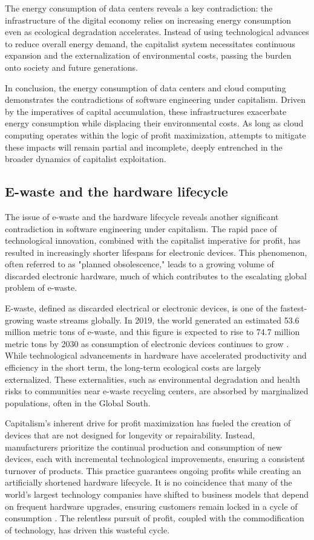 The energy consumption of data centers reveals a key contradiction: the infrastructure of the digital economy relies on increasing energy consumption even as ecological degradation accelerates. Instead of using technological advances to reduce overall energy demand, the capitalist system necessitates continuous expansion and the externalization of environmental costs, passing the burden onto society and future generations.

In conclusion, the energy consumption of data centers and cloud computing demonstrates the contradictions of software engineering under capitalism. Driven by the imperatives of capital accumulation, these infrastructures exacerbate energy consumption while displacing their environmental costs. As long as cloud computing operates within the logic of profit maximization, attempts to mitigate these impacts will remain partial and incomplete, deeply entrenched in the broader dynamics of capitalist exploitation.

\subsection{E-waste and the hardware lifecycle}

The issue of e-waste and the hardware lifecycle reveals another significant contradiction in software engineering under capitalism. The rapid pace of technological innovation, combined with the capitalist imperative for profit, has resulted in increasingly shorter lifespans for electronic devices. This phenomenon, often referred to as "planned obsolescence," leads to a growing volume of discarded electronic hardware, much of which contributes to the escalating global problem of e-waste.

E-waste, defined as discarded electrical or electronic devices, is one of the fastest-growing waste streams globally. In 2019, the world generated an estimated 53.6 million metric tons of e-waste, and this figure is expected to rise to 74.7 million metric tons by 2030 as consumption of electronic devices continues to grow \cite[pp.~4-5]{forti2020}. While technological advancements in hardware have accelerated productivity and efficiency in the short term, the long-term ecological costs are largely externalized. These externalities, such as environmental degradation and health risks to communities near e-waste recycling centers, are absorbed by marginalized populations, often in the Global South.

Capitalism's inherent drive for profit maximization has fueled the creation of devices that are not designed for longevity or repairability. Instead, manufacturers prioritize the continual production and consumption of new devices, each with incremental technological improvements, ensuring a consistent turnover of products. This practice guarantees ongoing profits while creating an artificially shortened hardware lifecycle. It is no coincidence that many of the world's largest technology companies have shifted to business models that depend on frequent hardware upgrades, ensuring customers remain locked in a cycle of consumption \cite[pp.~101-102]{maxwell2012}. The relentless pursuit of profit, coupled with the commodification of technology, has driven this wasteful cycle.

